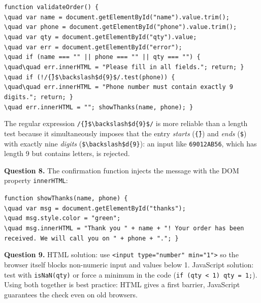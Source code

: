 \documentclass[11pt]{article}
\begin{document}
\begin{center}
\texttt{function validateOrder() \{}\\
\texttt{\textbackslash{}quad var name = document.getElementById("name").value.trim();}\\
\texttt{\textbackslash{}quad var phone = document.getElementById("phone").value.trim();}\\
\texttt{\textbackslash{}quad var qty = document.getElementById("qty").value;}\\
\texttt{\textbackslash{}quad var err = document.getElementById("error");}\\
\texttt{\textbackslash{}quad if (name === "" || phone === "" || qty === "") \{}\\
\texttt{\textbackslash{}quad\textbackslash{}quad err.innerHTML = "Please fill in all fields."; return; \}}\\
\texttt{\textbackslash{}quad if (!/\^\{\}\$\textbackslash{}backslash\$d\{9\}\$/.test(phone)) \{}\\
\texttt{\textbackslash{}quad\textbackslash{}quad err.innerHTML = "Phone number must contain exactly 9 digits."; return; \}}\\
\texttt{\textbackslash{}quad err.innerHTML = ""; showThanks(name, phone); \}}
\end{center}

The regular expression \texttt{/\^\{\}\$\textbackslash{}backslash\$d\{9\}\$/} is more reliable than a length test because it simultaneously imposes that the entry \emph{starts} (\texttt{\^\{\}}) and \emph{ends} (\texttt{\$}) with exactly nine \emph{digits} (\texttt{\$\textbackslash{}backslash\$d\{9\}}): an input like \texttt{69012AB56}, which has length 9 but contains letters, is rejected.

\textbf{Question 8.} The confirmation function injects the message with the DOM property \texttt{innerHTML}:

\begin{center}
\texttt{function showThanks(name, phone) \{}\\
\texttt{\textbackslash{}quad var msg = document.getElementById("thanks");}\\
\texttt{\textbackslash{}quad msg.style.color = "green";}\\
\texttt{\textbackslash{}quad msg.innerHTML = "Thank you " + name + "! Your order has been received. We will call you on " + phone + "."; \}}
\end{center}

\textbf{Question 9.} HTML solution: use \texttt{<input type="number" min="1">} so the browser itself blocks non-numeric input and values below 1. JavaScript solution: test with \texttt{isNaN(qty)} or force a minimum in the code (\texttt{if (qty < 1) qty = 1;}). Using both together is best practice: HTML gives a first barrier, JavaScript guarantees the check even on old browsers.
\end{document}
